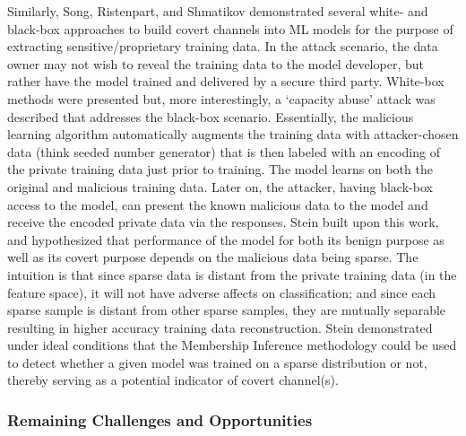 \documentclass[11pt]{article}
\begin{document}
Similarly, Song, Ristenpart, and Shmatikov demonstrated several white- and black-box approaches to build covert channels into ML models for the purpose of extracting sensitive/proprietary training data.  In the attack scenario, the data owner may not wish to reveal the training data to the model developer, but rather have the model trained and delivered by a secure third party.  White-box methods were presented but, more interestingly, a `capacity abuse' attack was described that addresses the black-box scenario.  Essentially, the malicious learning algorithm automatically augments the training data with attacker-chosen data (think seeded number generator) that is then labeled with an encoding of the private training data just prior to training.  The model learns on both the original and malicious training data.  Later on, the attacker, having black-box access to the model, can present the known malicious data to the model and receive the encoded private data via the responses.  Stein built upon this work, and hypothesized that performance of the model for both its benign purpose as well as its covert purpose depends on the malicious data being sparse. \cite{stein2018covert} The intuition is that since sparse data is distant  from the private training data (in the feature space), it will not have adverse affects on classification; and since each sparse sample is distant from other sparse samples, they are mutually separable resulting in higher accuracy training data reconstruction.  Stein demonstrated under ideal conditions that the Membership Inference \cite{shokri2017membership} methodology could be used to detect whether a given model was trained on a sparse distribution or not, thereby serving as a potential indicator of covert channel(s).

\subsubsection{Remaining Challenges and Opportunities}
\end{document}
